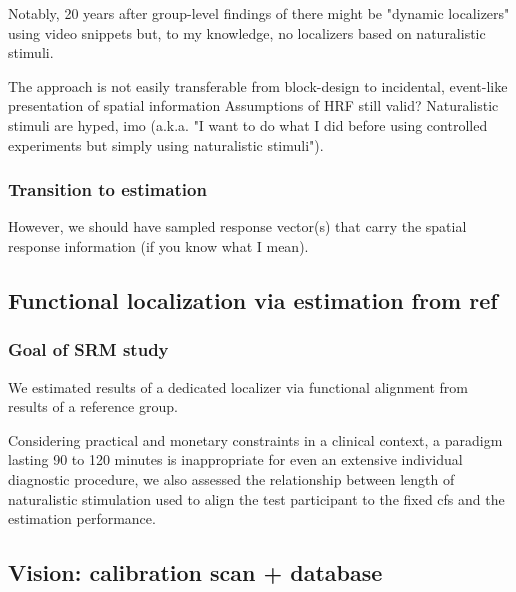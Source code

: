 
Notably, 20 years after group-level findings of \citep{bartels2004mapping} there
might be "dynamic localizers" using video snippets
\citep{pitcher2011differential, fox2009defining} but, to my knowledge, no
localizers based on naturalistic stimuli.

%
The approach is not easily transferable from block-design to incidental,
event-like presentation of spatial information
%
Assumptions of HRF still valid?
%
Naturalistic stimuli are hyped, imo (a.k.a. "I want to do what I did before
using controlled experiments but simply using naturalistic stimuli").


\subsubsection{Transition to estimation}

%
However, we should have sampled response vector(s) that carry the spatial
response information (if you know what I mean).



\subsection{Functional localization via estimation from ref}


\subsubsection{Goal of SRM study}
We estimated results of a dedicated localizer \citep{sengupta2016extension} via
functional alignment from results of a reference group.


Considering practical and monetary constraints in a clinical context, a paradigm
lasting 90 to 120 minutes is inappropriate for even an extensive individual
diagnostic procedure, we also assessed the relationship between length of
naturalistic stimulation used to align the test participant to the fixed
\ac{cfs} and the estimation performance.



\subsection{Vision: calibration scan + database}



